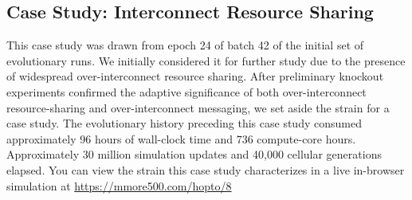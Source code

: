 \subsection{Case Study: Interconnect Resource Sharing}



This case study was drawn from epoch 24 of batch 42 of the initial set of evolutionary runs.
We initially considered it for further study due to the presence of widespread over-interconnect resource sharing.
After preliminary knockout experiments confirmed the adaptive significance of both over-interconnect resource-sharing and over-interconnect messaging, we set aside the strain for a case study.
The evolutionary history preceding this case study consumed approximately 96 hours of wall-clock time and 736 compute-core hours.
Approximately 30 million simulation updates and 40,000 cellular generations elapsed.
You can view the strain this case study characterizes in a live in-browser simulation at \url{https://mmore500.com/hopto/8}


